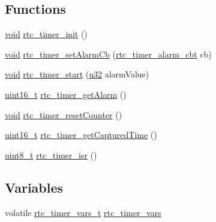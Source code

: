 \subsection*{Functions}
\begin{DoxyCompactItemize}
\item 
\hyperlink{usb__devapi_8h_afabf60e7f57651d6d595a02c75f07cd0}{void} \hyperlink{iot-lab___a8-_m3_2rtc__timer_8c_a2fec25529d64392ec0e05e82ae1a6d3d}{rtc\+\_\+timer\+\_\+init} ()
\item 
\hyperlink{usb__devapi_8h_afabf60e7f57651d6d595a02c75f07cd0}{void} \hyperlink{iot-lab___a8-_m3_2rtc__timer_8c_a76ad10e60d7fd22eedc47abfb9099501}{rtc\+\_\+timer\+\_\+set\+Alarm\+Cb} (\hyperlink{openmotestm_2rtc__timer_8h_ae333b9179d396f03c9fc63b5692bc33a}{rtc\+\_\+timer\+\_\+alarm\+\_\+cbt} cb)
\item 
\hyperlink{usb__devapi_8h_afabf60e7f57651d6d595a02c75f07cd0}{void} \hyperlink{iot-lab___a8-_m3_2rtc__timer_8c_a016c61490a05f2bb2ab2f09a56cd5df0}{rtc\+\_\+timer\+\_\+start} (\hyperlink{agilefox_2library_2inc_2stm32f10x__type_8h_a2caf5cd7bcdbe1eefa727f44ffb10bac}{u32} alarm\+Value)
\item 
\hyperlink{_p_e___types_8h_a1f1825b69244eb3ad2c7165ddc99c956}{uint16\+\_\+t} \hyperlink{iot-lab___a8-_m3_2rtc__timer_8c_a259e703f234a5698cde733bb44d404c8}{rtc\+\_\+timer\+\_\+get\+Alarm} ()
\item 
\hyperlink{usb__devapi_8h_afabf60e7f57651d6d595a02c75f07cd0}{void} \hyperlink{iot-lab___a8-_m3_2rtc__timer_8c_a854dc3c4ddfb1c44e137ce07e1aeccd8}{rtc\+\_\+timer\+\_\+reset\+Counter} ()
\item 
\hyperlink{_p_e___types_8h_a1f1825b69244eb3ad2c7165ddc99c956}{uint16\+\_\+t} \hyperlink{iot-lab___a8-_m3_2rtc__timer_8c_a0aa4605ced8faece6860083541548831}{rtc\+\_\+timer\+\_\+get\+Captured\+Time} ()
\item 
\hyperlink{_p_e___types_8h_aba7bc1797add20fe3efdf37ced1182c5}{uint8\+\_\+t} \hyperlink{iot-lab___a8-_m3_2rtc__timer_8c_a1e8d1aba2a068073562381de0bba40ac}{rtc\+\_\+timer\+\_\+isr} ()
\end{DoxyCompactItemize}
\subsection*{Variables}
\begin{DoxyCompactItemize}
\item 
volatile \hyperlink{structrtc__timer__vars__t}{rtc\+\_\+timer\+\_\+vars\+\_\+t} \hyperlink{iot-lab___a8-_m3_2rtc__timer_8c_ab5859ed0606df1d431471ed50bb1ec73}{rtc\+\_\+timer\+\_\+vars}
\end{DoxyCompactItemize}


